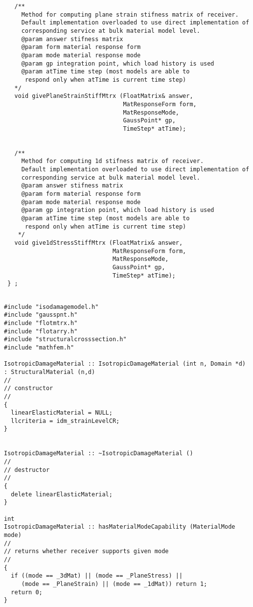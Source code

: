 \documentclass[a4paper]{article}
\begin{document}
{\begin{verbatim}
   /**
     Method for computing plane strain stifness matrix of receiver.
     Default implementation overloaded to use direct implementation of 
     corresponding service at bulk material model level.
     @param answer stifness matrix
     @param form material response form
     @param mode material response mode
     @param gp integration point, which load history is used
     @param atTime time step (most models are able to 
      respond only when atTime is current time step)
   */
   void givePlaneStrainStiffMtrx (FloatMatrix& answer, 
                                  MatResponseForm form,
                                  MatResponseMode,
                                  GaussPoint* gp, 
                                  TimeStep* atTime);


   /**
     Method for computing 1d stifness matrix of receiver.
     Default implementation overloaded to use direct implementation of 
     corresponding service at bulk material model level.
     @param answer stifness matrix
     @param form material response form
     @param mode material response mode
     @param gp integration point, which load history is used
     @param atTime time step (most models are able to 
      respond only when atTime is current time step)
    */
   void give1dStressStiffMtrx (FloatMatrix& answer, 
                               MatResponseForm form,
                               MatResponseMode,
                               GaussPoint* gp,
                               TimeStep* atTime);
 } ;

 \end{verbatim}
 }

{\small
\begin{verbatim}

#include "isodamagemodel.h"
#include "gausspnt.h"
#include "flotmtrx.h"
#include "flotarry.h"
#include "structuralcrosssection.h"
#include "mathfem.h"

IsotropicDamageMaterial :: IsotropicDamageMaterial (int n, Domain *d)
: StructuralMaterial (n,d)
//
// constructor
//
{
  linearElasticMaterial = NULL;
  llcriteria = idm_strainLevelCR;
}


IsotropicDamageMaterial :: ~IsotropicDamageMaterial ()
//
// destructor
//
{
  delete linearElasticMaterial;
}

int
IsotropicDamageMaterial :: hasMaterialModeCapability (MaterialMode mode)
//
// returns whether receiver supports given mode
//
{
  if ((mode == _3dMat) || (mode == _PlaneStress) || 
     (mode == _PlaneStrain) || (mode == _1dMat)) return 1;
  return 0;
}
\end{verbatim}}
\end{document}
